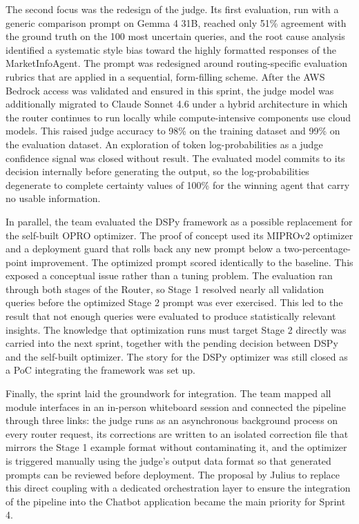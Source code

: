 The second focus was the redesign of the judge. Its first evaluation, run with a generic comparison prompt on Gemma 4 31B, reached only 51\% agreement with the ground truth on the 100 most uncertain queries, and the root cause analysis identified a systematic style bias toward the highly formatted responses of the MarketInfoAgent. The prompt was redesigned around routing-specific evaluation rubrics that are applied in a sequential, form-filling scheme. After the AWS Bedrock access was validated and ensured in this sprint, the judge model was additionally migrated to Claude Sonnet 4.6 under a hybrid architecture in which the router continues to run locally while compute-intensive components use cloud models. This raised judge accuracy to 98\% on the training dataset and 99\% on the evaluation dataset. An exploration of token log-probabilities as a judge confidence signal was closed without result. The evaluated model commits to its decision internally before generating the output, so the log-probabilities degenerate to complete certainty values of 100\% for the winning agent that carry no usable information.

In parallel, the team evaluated the DSPy framework \autocite{khattab2024dspy} as a possible replacement for the self-built OPRO optimizer. The proof of concept used its MIPROv2 optimizer and a deployment guard that rolls back any new prompt below a two-percentage-point improvement. The optimized prompt scored identically to the baseline. This exposed a conceptual issue rather than a tuning problem. The evaluation ran through both stages of the Router, so Stage 1 resolved nearly all validation queries before the optimized Stage 2 prompt was ever exercised. This led to the result that not enough queries were evaluated to produce statistically relevant insights. The knowledge that optimization runs must target Stage 2 directly was carried into the next sprint, together with the pending decision between DSPy and the self-built optimizer. The story for the DSPy optimizer was still closed as a PoC integrating the framework was set up.

Finally, the sprint laid the groundwork for integration. The team mapped all module interfaces in an in-person whiteboard session and connected the pipeline through three links: the judge runs as an asynchronous background process on every router request, its corrections are written to an isolated correction file that mirrors the Stage 1 example format without contaminating it, and the optimizer is triggered manually using the judge's output data format so that generated prompts can be reviewed before deployment. The proposal by Julius to replace this direct coupling with a dedicated orchestration layer to ensure the integration of the pipeline into the Chatbot application became the main priority for Sprint 4.

